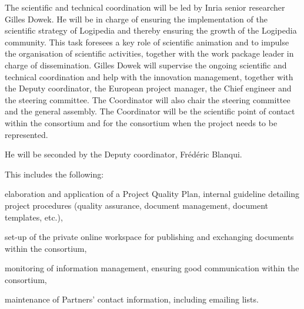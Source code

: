 \begin{workpackage}[id=management,type=MGT,wphases=1-48,
  short=Management,
  title=Management,
  lead=Inr,InrRM=34,InnRM=2,SacRM=2,TumRM=2,LieRM=2,BelRM=2,DelRM=2,FauRM=2]
\begin{tasklist}
  \begin{task}[id=coordination,title=Scientific and technical coordination,shorttitle=Sci.\&tech.,lead=Inr,InrRM=10,wphases=1-48]
    The scientific and technical coordination will be led by Inria
    senior researcher Gilles Dowek. He will be in charge of ensuring
    the implementation of the scientific strategy of Logipedia and
    thereby ensuring the growth of the Logipedia community. This task
    foresees a key role of scientific animation and to impulse the
    organisation of scientific activities, together with the work package
    leader
    in charge of dissemination. Gilles Dowek will supervise the
    ongoing scientific and technical coordination and help with the
    innovation management, together with the Deputy coordinator,
    the European project manager, 
    the
    Chief engineer and the steering committee. The
    Coordinator will also chair the steering committee and the general
    assembly. The Coordinator will be the scientific point of contact
    within the consortium and for the consortium when the project
    needs to be represented.

    He will be seconded by the Deputy coordinator, Frédéric
    Blanqui.
  \end{task}


  \begin{task}[id=quality,title=Quality management,shorttitle=Sci.\&tech.,lead=Inr,InrRM=10,wphases=1-48]

    This includes the following:
\begin{compactitem}
\item
  elaboration and application of a Project Quality Plan, internal
  guideline detailing project procedures (quality assurance, document
  management, document templates, etc.),
\item
  set-up of the private online workspace for publishing and exchanging
  documents within the consortium, 
\item
  monitoring of information management, ensuring good communication
  within the consortium,
\item
  maintenance of Partners’ contact information, including emailing lists.
\end{compactitem}
\end{task}


\end{tasklist}
\end{workpackage}
